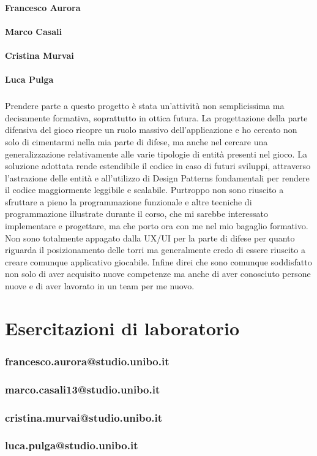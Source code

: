 \documentclass[a4paper,12pt]{report}
\begin{document}
\subsubsection{Francesco Aurora}
\subsubsection{Marco Casali}
\subsubsection{Cristina Murvai}
\subsubsection{Luca Pulga}
\paragraph{}Prendere parte a questo progetto è stata un'attività non semplicissima ma decisamente formativa, soprattutto in ottica futura.
La progettazione della parte difensiva del gioco ricopre un ruolo massivo dell'applicazione e ho cercato non solo di cimentarmi nella mia parte di difese, ma anche nel cercare una generalizzazione relativamente alle varie tipologie di entità presenti nel gioco. La soluzione adottata rende estendibile il codice in caso di futuri sviluppi, attraverso l'astrazione delle entità e all'utilizzo di Design Patterns fondamentali per rendere il codice maggiormente leggibile e scalabile. Purtroppo non sono riuscito a sfruttare a pieno la programmazione funzionale e altre tecniche di programmazione illustrate durante il corso, che mi sarebbe interessato implementare e progettare, ma che porto ora con me nel mio bagaglio formativo. Non sono totalmente appagato dalla UX/UI per la parte di difese per quanto riguarda il posizionamento delle torri ma generalmente credo di essere riuscito a creare comunque applicativo giocabile. Infine direi che sono comunque soddisfatto non solo di aver acquisito nuove competenze ma anche di aver conosciuto persone nuove e di aver lavorato in un team per me nuovo.





\chapter{Esercitazioni di laboratorio}

\subsection{francesco.aurora@studio.unibo.it}

\subsection{marco.casali13@studio.unibo.it}

\subsection{cristina.murvai@studio.unibo.it}

\subsection{luca.pulga@studio.unibo.it}
\end{document}
